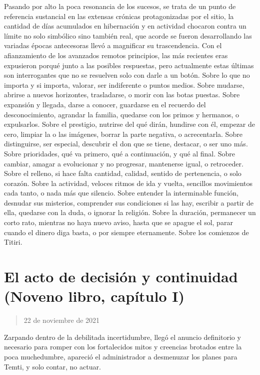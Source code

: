 \documentclass[
  spanish,
]{book}
\begin{document}
Pasando por alto la poca resonancia de los sucesos, se trata de un punto de referencia sustancial en las extensas crónicas protagonizadas por el sitio, la cantidad de días acumulados en hibernación y en actividad chocaron contra un límite no solo simbólico sino también real, que acorde se fueron desarrollando las variadas épocas antecesoras llevó a magnificar su trascendencia. Con el afianzamiento de los avanzados remotos principios, las más recientes eras expusieron porqué junto a las posibles respuestas, pero actualmente estas últimas son interrogantes que no se resuelven solo con darle a un botón. Sobre lo que no importa y si importa, valorar, ser indiferente o puntos medios. Sobre mudarse, abrirse a nuevos horizontes, trasladarse, o morir con las botas puestas. Sobre expansión y llegada, darse a conocer, guardarse en el recuerdo del desconocimiento, agrandar la familia, quedarse con los primos y hermanos, o expulsarlos. Sobre el prestigio, nutrirse del qué dirán, hundirse con él, empezar de cero, limpiar la o las imágenes, borrar la parte negativa, o acrecentarla. Sobre distinguirse, ser especial, descubrir el don que se tiene, destacar, o ser uno más. Sobre prioridades, qué va primero, qué a continuación, y qué al final. Sobre cambiar, amagar a evolucionar y no progresar, mantenerse igual, o retroceder. Sobre el relleno, si hace falta cantidad, calidad, sentido de pertenencia, o solo corazón. Sobre la actividad, veloces ritmos de ida y vuelta, sencillos movimientos cada tanto, o nada más que silencio. Sobre entender la interminable función, desnudar sus misterios, comprender sus condiciones si las hay, escribir a partir de ella, quedarse con la duda, o ignorar la religión. Sobre la duración, permanecer un corto rato, mientras no haya nuevo aviso, hasta que se apague el sol, parar cuando el dinero diga basta, o por siempre eternamente. Sobre los comienzos de Titiri.

\hypertarget{el-acto-de-decisiuxf3n-y-continuidad-noveno-libro-capuxedtulo-i}{%
\section{El acto de decisión y continuidad (Noveno libro, capítulo I)}\label{el-acto-de-decisiuxf3n-y-continuidad-noveno-libro-capuxedtulo-i}}

\begin{quote}
22 de noviembre de 2021
\end{quote}

Zarpando dentro de la debilitada incertidumbre, llegó el anuncio definitorio y necesario para romper con los fortalecidos mitos y creencias brotados entre la poca muchedumbre, apareció el administrador a desmenuzar los planes para Temti, y solo contar, no actuar.
\end{document}
